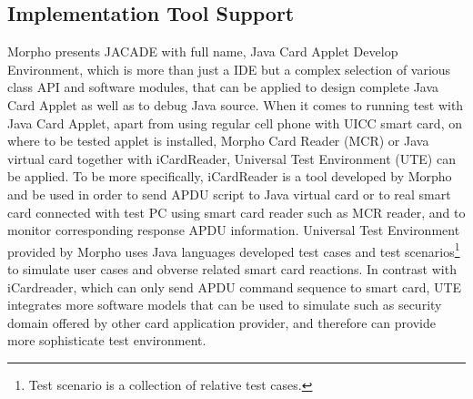 \subsection{Implementation Tool Support}
Morpho presents JACADE with full name, Java Card Applet Develop Environment, which is more than just a IDE but a complex selection of various class API and software modules, that can be applied to design complete Java Card Applet as well as to debug Java source. When it comes to running test with Java Card Applet, apart from using regular cell phone with UICC smart card, on where to be tested applet is installed, Morpho Card Reader (MCR) or Java virtual card together with iCardReader, Universal Test Environment (UTE) can be applied. To be more specifically, iCardReader is a tool developed by Morpho and be used in order to send APDU script to Java virtual card or to real smart card connected with test PC using smart card reader such as MCR reader, and to monitor corresponding response APDU information. Universal Test Environment provided by Morpho uses Java languages developed test cases and test scenarios\footnote{Test scenario is a collection of relative test cases.} to simulate user cases and obverse related smart card reactions. In contrast with iCardreader, which can only send APDU command sequence to smart card, UTE integrates more software models that can be used to simulate such as security domain offered by other card application provider, and therefore can provide more sophisticate test environment.